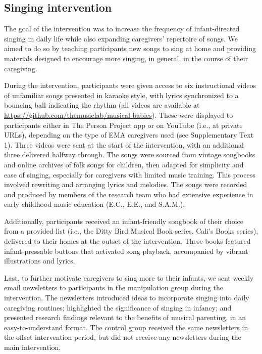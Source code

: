 \documentclass[
]{article}
\begin{document}
\subsection{Singing intervention}\label{singing-intervention}

The goal of the intervention was to increase the frequency of
infant-directed singing in daily life while also expanding caregivers'
repertoire of songs. We aimed to do so by teaching participants new
songs to sing at home and providing materials designed to encourage more
singing, in general, in the course of their caregiving.

During the intervention, participants were given access to six
instructional videos of unfamiliar songs presented in karaoke style,
with lyrics synchronized to a bouncing ball indicating the rhythm (all
videos are available at
\url{https://github.com/themusiclab/musical-babies}). These were
displayed to participants either in The Person Project app or on YouTube
(i.e., at private URLs), depending on the type of EMA caregivers used
(see Supplementary Text 1). Three videos were sent at the start of the
intervention, with an additional three delivered halfway through. The
songs were sourced from vintage songbooks and online archives of folk
songs for children, then adapted for simplicity and ease of singing,
especially for caregivers with limited music training. This process
involved rewriting and arranging lyrics and melodies. The songs were
recorded and produced by members of the research team who had extensive
experience in early childhood music education (E.C., E.E., and S.A.M.).

Additionally, participants received an infant-friendly songbook of their
choice from a provided list (i.e., the Ditty Bird Musical Book series,
Cali's Books series), delivered to their homes at the outset of the
intervention. These books featured infant-pressable buttons that
activated song playback, accompanied by vibrant illustrations and
lyrics.

Last, to further motivate caregivers to sing more to their infants, we
sent weekly email newsletters to participants in the manipulation group
during the intervention. The newsletters introduced ideas to incorporate
singing into daily caregiving routines; highlighted the significance of
singing in infancy; and presented research findings relevant to the
benefits of musical parenting, in an easy-to-understand format. The
control group received the same newsletters in the offset intervention
period, but did not receive any newsletters during the main
intervention.
\end{document}
